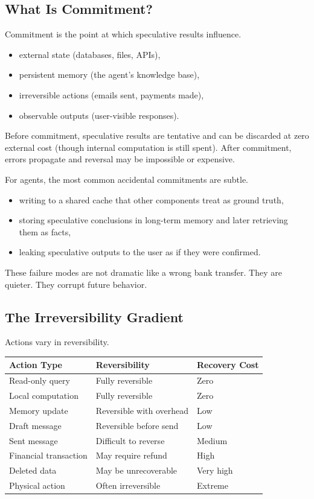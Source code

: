\subsection{What Is Commitment?}

Commitment is the point at which speculative results influence.

\begin{itemize}
\item external state (databases, files, APIs),
\item persistent memory (the agent's knowledge base),
\item irreversible actions (emails sent, payments made),
\item observable outputs (user-visible responses).
\end{itemize}

Before commitment, speculative results are tentative and can be discarded at zero external cost (though internal computation is still spent). After commitment, errors propagate and reversal may be impossible or expensive.

For agents, the most common accidental commitments are subtle.
\begin{itemize}
\item writing to a shared cache that other components treat as ground truth,
\item storing speculative conclusions in long-term memory and later retrieving them as facts,
\item leaking speculative outputs to the user as if they were confirmed.
\end{itemize}
These failure modes are not dramatic like a wrong bank transfer. They are quieter. They corrupt future behavior.

\subsection{The Irreversibility Gradient}

Actions vary in reversibility.

\begin{center}
\begin{tabular}{lll}
\toprule
Action Type & Reversibility & Recovery Cost \\
\midrule
Read-only query & Fully reversible & Zero \\
Local computation & Fully reversible & Zero \\
Memory update & Reversible with overhead & Low \\
Draft message & Reversible before send & Low \\
Sent message & Difficult to reverse & Medium \\
Financial transaction & May require refund & High \\
Deleted data & May be unrecoverable & Very high \\
Physical action & Often irreversible & Extreme \\
\bottomrule
\end{tabular}
\end{center}

